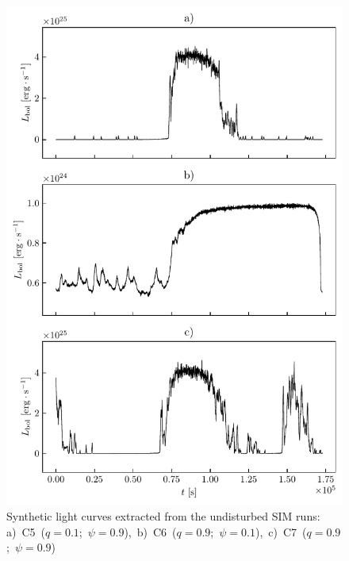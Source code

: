     \begin{figure}
    \begin{center}
        \includegraphics[width=1.0\textwidth]{img/plot_light_curves_disturbed.pdf}
    \end{center}
    \caption{Synthetic light curves extracted from the undisturbed SIM runs: \mbox{a) C5 ($q = 0.1$; $\psi = 0.9$), b) C6 ($q = 0.9$; $\psi = 0.1$), c) C7 ($q = 0.9$; $\psi = 0.9$)}}
    \label{fig:plot_light_curves_disturbed}
    \end{figure}
